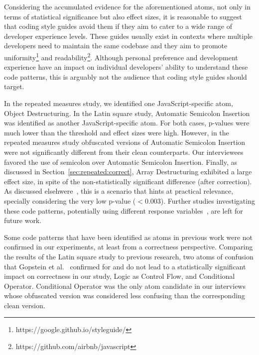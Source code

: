 Considering the accumulated evidence for the aforementioned atoms, not only in terms of statistical significance but also effect sizes, it is reasonable to suggest that coding style guides avoid them if they aim to cater to a wide range of developer experience levels. These guides usually exist in contexts where multiple developers need to maintain the same codebase and they aim to promote uniformity\footnote{https://google.github.io/styleguide/} and readability\footnote{https://github.com/airbnb/javascript}. Although personal preference and development experience have an impact on individual developers' ability to understand these code patterns, this is arguably not the audience that coding style guides should target. 

In the repeated measures study, we identified one JavaScript-specific atom, Object Destructuring. In the Latin square study, Automatic Semicolon Insertion was identified as another JavaScript-specific atom. For both cases, p-values were much lower than the threshold and effect sizes were high. However, in the repeated measures study obfuscated versions of Automatic Semicolon Insertion were not significantly different from their clean counterparts. Our interviewees favored the use of semicolon over Automatic Semicolon Insertion. Finally, as discussed in Section~\ref{sec:repeated:correct}, Array Destructuring exhibited a large effect size, in spite of the non-statistically significant difference (after correction). As discussed elsehwere~\cite{Ellis:2010:EGE}, this is a scenario that hints at practical relevance, specially considering the very low p-value ($< 0.003$). Further studies investigating these code patterns, potentially using different response variables~\cite{Oliveira:2020:ECR,Feitelson:2021:CPC}, are left for future work. 

Some code patterns that have been identified as atoms in previous work were not confirmed in our experiments, at least from a correctness perspective. Comparing the results of the Latin square study to previous research, two atoms of confusion that Gopstein et al.~\cite{DBLP:conf/sigsoft/GopsteinIYDZYC17} confirmed for \clang and \cpplang do not lead to a statistically significant impact on correctness in our study, Logic as Control Flow, and Conditional Operator. Conditional Operator was the only atom candidate in our interviews whose obfuscated version was considered less confusing than the corresponding clean version. 

